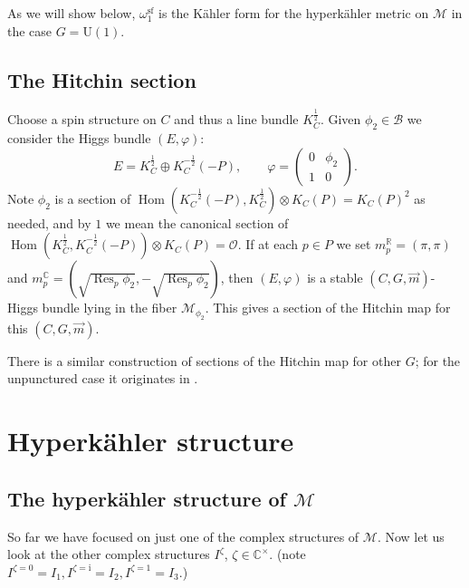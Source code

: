 \documentclass[12pt,letterpaper,reqno]{article}
\numberwithin{equation}{section}
\newcommand{\cB}{\ensuremath{\mathcal B}}
\newcommand{\cM}{\ensuremath{\mathcal M}}
\newcommand{\cO}{\ensuremath{\mathcal O}}
\newcommand{\R}{\ensuremath{\mathbb R}}
\newcommand{\C}{\ensuremath{\mathbb C}}
\newcommand{\half}{\ensuremath{\frac{1}{2}}}
\newcommand{\kahler}{K\"ahler\xspace}
\newcommand{\hk}{hyperk\"ahler\xspace}
\newcommand{\I}{{\mathrm i}}
\renewcommand{\sf}{\mathrm{sf}}
\newcommand{\vphi}{{\vec\phi}}
\DeclareMathOperator{\Hom}{Hom}
\DeclareMathOperator{\Res}{Res}
\newcommand{\SU}{\mathrm{SU}}
\newcommand{\U}{\mathrm{U}}
\begin{document}
As we will show below, $\omega_1^\sf$ is the \kahler
form for the \hk metric on $\cM$ in the case $G = \U(1)$.


\subsection{The Hitchin section}


\begin{defn}[Hitchin section, for $G = \SU(2)$]
Choose a spin structure on $C$ and thus a line bundle
$K_C^\half$.
Given $\phi_2 \in \cB$ we consider the Higgs bundle
$(E,\varphi)$:
\begin{equation}
  E = K_C^{\half} \oplus K_C^{-\half}(-P), \qquad \varphi = \begin{pmatrix} 0 & \phi_2 \\ 1 & 0 \end{pmatrix}.
\end{equation}
Note $\phi_2$ is a section of $\Hom(K_C^{-\half}(-P), K_C^\half) \otimes K_C(P) = K_C(P)^2$ as needed, and by $1$ we mean the 
canonical section of $\Hom(K_C^\half, K_C^{-\half}(-P)) \otimes K_C(P) = \cO$. If at each $p \in P$ we set
$m^\R_p = (\pi,\pi)$
and $m^\C_p = (\sqrt{\Res_p \phi_2}, -\sqrt{\Res_p \phi_2})$,
then $(E,\varphi)$ is a stable $(C,G,\vec{m})$-Higgs bundle
lying in the fiber $\cM_{\phi_2}$.
This gives a section of the Hitchin map for this $(C,G,\vec{m})$.
\end{defn}
There is a similar construction of sections
of the Hitchin map for other $G$; for the
unpunctured case it originates in \cite{MR1174252}.



\section{Hyperk\"ahler structure}

\subsection{The hyperk\"ahler structure of \texorpdfstring{$\cM$}{M}}

So far we have focused on just one of the complex
structures of $\cM$. Now let us look at the other
complex structures $I^\zeta$, $\zeta \in \C^\times$.
(note $I^{\zeta=0} = I_1, I^{\zeta = \I} = I_2, I^{\zeta = 1} = I_3$.)
\end{document}
